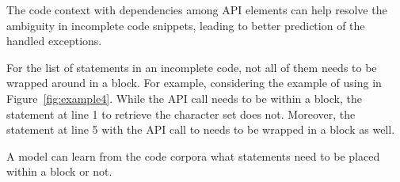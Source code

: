 

\begin{Observation} 
\label{ob4}
The code context with dependencies among API elements can help resolve
the ambiguity
in incomplete code snippets, leading to better prediction of the
handled exceptions.
\end{Observation}


For the list of statements in an incomplete code, not all of them
needs to be wrapped around in a  block. For example,
considering the example of using  in
Figure~\ref{fig:example4}. While the API call
 needs to be within a
 block, the statement at line 1 to retrieve the
character set does not. Moreover, the statement at line 5 with the API
call to  needs to be wrapped in a 
block as well.






\begin{Observation} 
\label{ob5}
  A model can learn from the code corpora what statements need to be placed
  within a  block or not.
\end{Observation}

